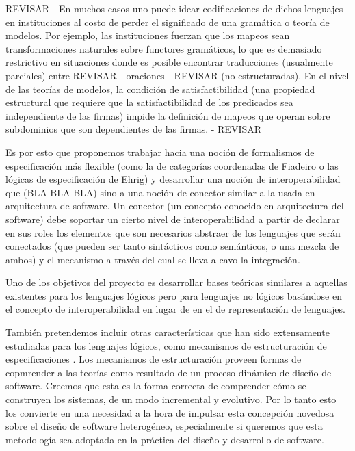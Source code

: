 \documentclass[a4paper, 11pt]{article}
\begin{document}
  REVISAR -
  En muchos casos uno puede idear codificaciones de dichos lenguajes en instituciones al costo de perder el significado de una gramática o teoría de modelos. Por ejemplo, las instituciones fuerzan que los mapeos sean transformaciones naturales sobre functores gramáticos, lo que es demasiado restrictivo en situaciones donde es posible encontrar traducciones (usualmente parciales) entre REVISAR - oraciones - REVISAR (no estructuradas). En el nivel de las teorías de modelos, la condición de satisfactibilidad (una propiedad estructural que requiere que la satisfactibilidad de los predicados sea independiente de las firmas) impide la definición de mapeos que operan sobre subdominios que son dependientes de las firmas.
  - REVISAR
  
  Es por esto que proponemos trabajar hacia una noción de formalismos de especificación más flexible (como la de categorías coordenadas de Fiadeiro o las lógicas de especificación de Ehrig) y desarrollar una noción de interoperabilidad  que (BLA BLA BLA) sino a una noción de conector similar a la usada en arquitectura de software. Un conector (un concepto conocido en arquitectura del software) debe soportar un cierto nivel de interoperabilidad a partir de declarar en sus roles los elementos que son necesarios abstraer de los lenguajes que serán  conectados (que pueden ser tanto sintácticos como semánticos, o una mezcla de ambos) y el mecanismo a través del cual se lleva a cavo la integración.

  Uno de los objetivos del proyecto es desarrollar bases teóricas similares a aquellas existentes para los lenguajes lógicos pero para lenguajes no lógicos basándose en el concepto de interoperabilidad en lugar de en el de representación de lenguajes.
  
  También pretendemos incluir otras características que han sido extensamente estudiadas para los lenguajes lógicos, como mecanismos de estructuración de especificaciones \cite{borzyszkowski:tcs-286_2,lopezpombo:ictac10}. Los mecanismos de estructuración proveen formas de copmrender a las teorías como resultado de un proceso dinámico de diseño de software. Creemos que esta es la forma correcta de comprender cómo se construyen los sistemas, de un modo incremental y evolutivo. Por lo tanto esto los convierte en una necesidad  a la hora de impulsar esta concepción novedosa sobre el diseño de software heterogéneo, especialmente si queremos que esta metodología sea adoptada en la práctica del diseño y desarrollo de software.
  
\end{document}
